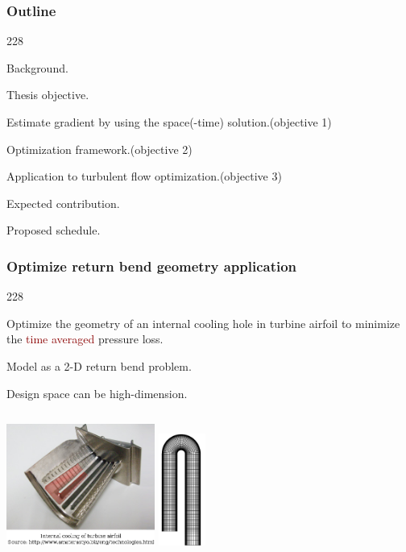\documentclass{beamer}
\let\oldcite=\cite
\renewcommand{\cite}[1]{\textcolor[rgb]{.4,.4,.85}{\oldcite{#1}}}
\newcommand{\barrow}{\item[\color{darkred}\ding{228}]}
\begin{document}
\begin{frame}
    \frametitle{Outline}\small
    \begin{dinglist}{228}
        \barrow {} Background.
        \barrow Thesis objective.
        \vspace{.35cm}
        \barrow Estimate gradient by using the space(-time) solution.\hfill(objective 1)
        \barrow Optimization framework.\hfill(objective 2)
        \barrow Application to turbulent flow optimization.\hfill(objective 3)
        \vspace{.35cm}
        \barrow Expected contribution.
        \barrow Proposed schedule.
    \end{dinglist}
\end{frame}


\begin{frame}
    \frametitle{Optimize return bend geometry \hfill \scriptsize{application}}\small
    \begin{dinglist}{228}
        \barrow Optimize the geometry of an internal cooling hole in turbine airfoil to minimize the 
                \textcolor{darkred}{time averaged} pressure loss.
        \scriptsize \cite{Coletti 13}\small
        \barrow Model as a 2-D return bend problem.
        \barrow Design space can be high-dimension.
    \end{dinglist}
    \begin{columns}
            \centering
            \includegraphics[height=4cm]{ubend.png}
            \centering
            \includegraphics[height=3.7cm]{overall_mesh.png}
    \end{columns}
\end{frame}
\end{document}
